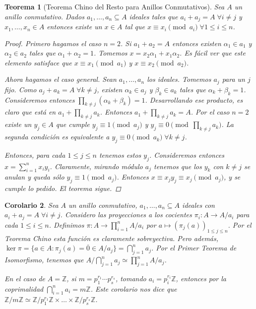 \documentclass[12pt]{book}
\newtheorem{teo}{Teorema}[section]
\newtheorem{cor}[teo]{Corolario}
\theoremstyle{definition}
\newcommand{\ZZ}{\mathbb{Z}}      %
\begin{document}
\begin{teo}[Teorema Chino del Resto para Anillos Conmutativos]

Sea $A$ un anillo conmutativo. Dados $a_1,\ldots , a_n\subseteq A$ ideales tales que $a_i+a_j = A \; \forall i\neq j$ y $x_1,\ldots , x_n\in A$ entonces existe un $x\in A$ tal que $x\equiv x_i \pmod{a_i} \; \forall 1\leq i\leq n$.

\begin{proof}

Primero hagamos el caso $n=2$. Si $a_1+a_2 = A$ entonces existen $\alpha_1\in a_1$ y $\alpha_2\in a_2$ tales que $\alpha_1+\alpha_2 = 1$. Tomemos $x = x_2\alpha_1 + x_1\alpha_2$. Es fácil ver que este elemento satisface que $x\equiv x_1\pmod{a_1}$ y $x\equiv x_2\pmod{a_2}$.

Ahora hagamos el caso general. Sean $a_1,\ldots , a_n$ los ideales. Tomemos $a_j$ para un $j$ fijo. Como $a_j + a_k = A \; \forall k\neq j$, existen $\alpha_k\in a_j$ y $\beta_k \in a_k$ tales que $\alpha_k + \beta_k = 1$. Consideremos entonces $\displaystyle\prod_{k\neq j}(\alpha_k + \beta_k) = 1$. Desarrollando ese producto, es claro que está en $a_1 + \displaystyle\prod_{k\neq j}a_k$. Entonces $a_1 + \displaystyle\prod_{k\neq j} a_k = A$. Por el caso $n=2$ existe un $y_j\in A$ que cumple $y_j \equiv 1 \pmod{a_j}$ y $y_j \equiv 0 \pmod{\displaystyle\prod_{k\neq j} a_k}$. La segunda condición es equivalente a $y_j \equiv 0 \pmod{a_k} \; \forall k\neq j$.

Entonces, para cada $1\leq j\leq n$ tenemos estos $y_j$. Consideremos entonces $x= \displaystyle\sum_{i=1}^{n} x_iy_i$. Claramente, mirando módulo $a_j$ tenemos que los $y_k$ con $k\neq j$ se anulan y queda sólo $y_j\equiv 1\pmod{a_j}$. Entonces $x \equiv x_jy_j\equiv x_j\pmod{a_j}$, y se cumple lo pedido. El teorema sigue.
\end{proof}
\end{teo}

\begin{cor}
Sea $A$ un anillo conmutativo, $a_1,\ldots , a_n\subseteq A$ ideales con $a_i+a_j = A \; \forall i\neq j$. Considero las proyecciones a los cocientes $\pi_i :A\to A/a_i$ para cada $1\leq i\leq n$. Definimos $\pi:A\to \displaystyle\prod_{i=1}^n A/a_i$ por $a\mapsto (\pi_j(a))_{1\leq j\leq n}$. Por el Teorema Chino esta función es claramente sobreyectiva. Pero además, $\ker \pi = \{a\in A : \pi_j(a) = \overline{0}\in A/a_j\} = \displaystyle\bigcap_{j=1}^n a_j$. Por el Primer Teorema de Isomorfismo, tenemos que $A/\displaystyle\bigcap_{j=1}^n a_j \simeq \displaystyle\prod_{j=1}^n A/a_j$.

En el caso de $A=\ZZ$, si $m=p_1^{r_1}\cdots p_s^{r_s}$, tomando $a_i = p_i^{r_i}\ZZ$, entonces por la coprimalidad $\displaystyle\bigcap_{i=1}^n a_i = m\ZZ$. Este corolario nos dice que $\ZZ/m\ZZ \simeq \ZZ/p_1^{r_1}\ZZ \times \ldots \times \ZZ/p_s^{r_s}\ZZ$.
\end{cor}
\end{document}
